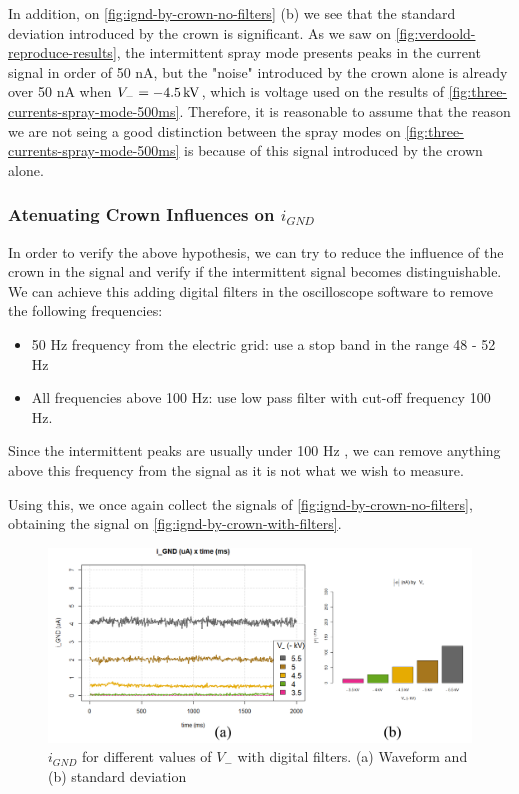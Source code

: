\documentclass[oneside,12pt]{article}
\begin{document}
In addition, on \autoref{fig:ignd-by-crown-no-filters} (b) we see that the standard deviation introduced by the crown
is significant. As we saw on \autoref{fig:verdoold-reproduce-results}, the intermittent spray mode 
presents peaks in the current signal in order of 50 nA, but the "noise" introduced by the 
crown alone is already over 50 nA when $V_- = -4.5 \,\mathrm{kV}$, which is voltage used on the results 
of \autoref{fig:three-currents-spray-mode-500ms}. Therefore, it is reasonable to assume that the reason we are
not seing a good distinction between the spray modes on \autoref{fig:three-currents-spray-mode-500ms} is 
because of this signal introduced by the crown alone.

\subsubsection{Atenuating Crown Influences on $i_{GND}$}

In order to verify the above hypothesis, we can try to reduce the influence of the crown
in the signal and verify if the intermittent signal becomes distinguishable. We can achieve this adding digital filters 
in the oscilloscope software to remove the following frequencies:

\begin{itemize}
    \item 50 Hz frequency from the electric grid: use a stop band in the range 48 - 52 Hz
    \item All frequencies above 100 Hz: use low pass filter with cut-off frequency 100 Hz.
\end{itemize}

Since the intermittent peaks are usually under 100 Hz \citep{Verdoold2013}, we can remove 
anything above this frequency from the signal as it is not what we wish to measure.

Using this, we once again collect the signals of \autoref{fig:ignd-by-crown-no-filters}, obtaining the signal 
on \autoref{fig:ignd-by-crown-with-filters}.

\begin{figure}[h!]
    \centering
    \includegraphics[width=1\textwidth,trim=1 1 1 1,clip]{figures/ignd-by-crown-with-filters.png}
    \caption{$i_{GND}$ for different values of $V_-$ with digital filters. (a) Waveform and (b) standard deviation}
    \label{fig:ignd-by-crown-with-filters}
\end{figure}
\end{document}

